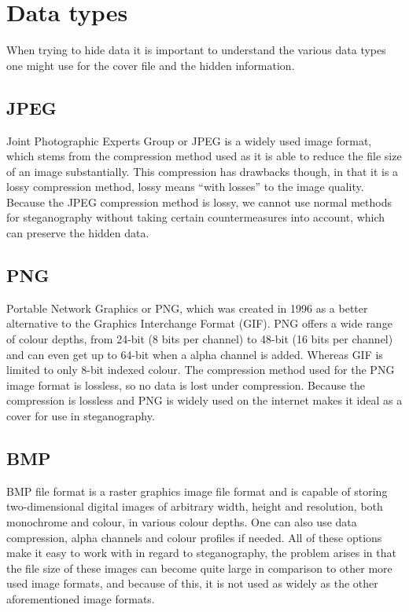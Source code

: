 \section{Data types}
When trying to hide data it is important to understand the various data types one might use for the cover file and the hidden information.

\subsection{JPEG}
Joint Photographic Experts Group or JPEG is a widely used image format, which stems from the compression method used as it is able to reduce the file size of an image substantially.
This compression has drawbacks though, in that it is a lossy compression method, lossy means ``with losses'' to the image quality.
Because the JPEG compression method is lossy, we cannot use normal methods for steganography without taking certain countermeasures into account, which can preserve the hidden data.
\iffalse{TODO: need to specify which countermeasures and rewrite the ending}\fi


\subsection{PNG}
Portable Network Graphics or PNG, which was created in 1996 as a better alternative to the Graphics Interchange Format (GIF).
PNG offers a wide range of colour depths, from 24-bit (8 bits per channel) to 48-bit (16 bits per channel) and can even get up to 64-bit when a alpha channel is added.
Whereas GIF is limited to only 8-bit indexed colour.
The compression method used for the PNG image format is lossless, so no data is lost under compression.
Because the compression is lossless and PNG is widely used on the internet makes it ideal as a cover for use in steganography.


\subsection{BMP}
BMP file format is a raster graphics image file format and is capable of storing two-dimensional digital images of arbitrary width, height and resolution, both monochrome and colour, in various colour depths. 
One can also use data compression, alpha channels and colour profiles if needed.
All of these options make it easy to work with in regard to steganography, the problem arises in that the file size of these images can become quite large in comparison to other more used image formats, and because of this, it is not used as widely as the other aforementioned image formats.



